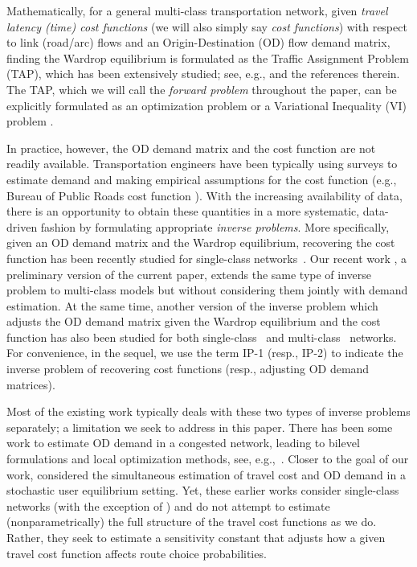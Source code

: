 \documentclass[3p]{elsarticle}
\begin{document}
Mathematically, for a general multi-class transportation network, given
\emph{travel latency (time) cost functions} (we will also simply say
\emph{cost functions}) with respect to link (road/arc) flows and an
Origin-Destination (OD) flow demand matrix, finding the Wardrop
equilibrium is formulated as the Traffic Assignment Problem (TAP), which
has been extensively studied; see, e.g., \cite{patriksson1994traffic}
and the references therein. The TAP, which we will call the
\emph{forward problem} throughout the paper, can be explicitly
formulated as an optimization problem \cite{dafermos1969traffic} or a
Variational Inequality (VI) problem \cite{dafermos1980traffic}.

In practice, however, the OD demand matrix and the cost function are not
readily available. Transportation engineers have been typically using
surveys to estimate demand and making empirical assumptions for the cost
function (e.g., Bureau of Public Roads cost function
\cite{branston1976link}). With the increasing availability of data,
there is an opportunity to obtain these quantities in a more systematic,
data-driven fashion by formulating appropriate \emph{inverse problems}.
More specifically, given an OD demand matrix and the Wardrop
equilibrium, recovering the cost function has been recently studied for
single-class networks~\cite{bertsimas2014data,CDC16,IFAC17}. Our recent
work \cite{CDC17}, a preliminary version of the current paper, extends
the same type of inverse problem to multi-class models but without
considering them jointly with demand estimation. At the same time,
another version of the inverse problem which adjusts the OD demand
matrix given the Wardrop equilibrium and the cost function has also been
studied for both
single-class~\cite{spiess1990gradient,lundgren2008heuristic,IFAC17,ieee18}
and multi-class~\cite{noriega2007multi} networks. For convenience, in
the sequel, we use the term IP-1 (resp., IP-2) to indicate the inverse
problem of recovering cost functions (resp., adjusting OD demand
matrices).

Most of the existing work typically deals with these two types of
inverse problems separately; a limitation we seek to address in this
paper. There has been some work to estimate OD demand in a congested
network, leading to bilevel formulations and local optimization methods,
see, e.g.,~\cite{florian1995coordinate,yang1995heuristic}. Closer to the
goal of our work, \cite{yang2001simultaneous} considered the
simultaneous estimation of travel cost and OD demand in a stochastic
user equilibrium setting. Yet, these earlier works consider single-class
networks (with the exception of \cite{noriega2007multi}) and do not
attempt to estimate (nonparametrically) the full structure of the travel
cost functions as we do. Rather, they seek to estimate a sensitivity
constant that adjusts how a given travel cost function affects route
choice probabilities.
\end{document}
